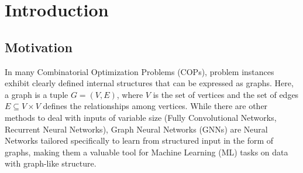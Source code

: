 \documentclass[draft,final]{vutinfth} %
\begin{document}
\frontmatter %

\addstatementpage

\begin{danksagung*}
\end{danksagung*}

\begin{acknowledgements*}
\end{acknowledgements*}

\begin{kurzfassung}
\end{kurzfassung}

\begin{abstract}
\end{abstract}


\tableofcontents %

\mainmatter

\chapter{Introduction}

\section{Motivation}
In many Combinatorial Optimization Problems (COPs), problem instances exhibit clearly defined internal structures that can be expressed as graphs. Here, a graph is a tuple $G = (V, E)$, where $V$ is the set of vertices and the set of edges $E \subseteq V \times V$ defines the relationships among vertices. While there are other methods to deal with inputs of variable size (Fully Convolutional Networks, Recurrent Neural Networks), Graph Neural Networks (GNNs) are Neural Networks tailored specifically to learn from structured input in the form of graphs, making them a valuable tool for Machine Learning (ML) tasks on data with graph-like structure.   
\end{document}
